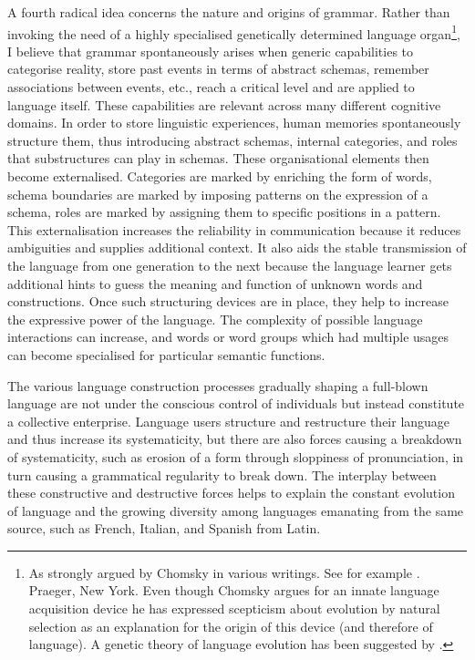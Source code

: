 A fourth radical idea concerns the nature and origins of 
grammar. Rather than invoking the need of a highly 
specialised genetically determined language 
organ\footnote{
As strongly argued by Chomsky in various writings. 
See for example \cite{Chomsky:1968}. 
Praeger, New York. Even though Chomsky argues for 
an innate language acquisition device he has expressed
scepticism about evolution by natural selection
as an explanation for the 
origin of this device (and therefore of language). 
A genetic theory of language evolution 
has been suggested by \cite{Pinker:1994}.}, 
I believe that grammar spontaneously arises when 
generic capabilities to categorise reality, store past
events in terms of abstract schemas, remember associations
between events, etc., reach a critical level and are
applied to language itself. These capabilities are 
relevant across many different cognitive domains. 
In order to store linguistic
experiences, human memories spontaneously structure them, thus 
introducing abstract schemas, internal categories, and 
roles that substructures can play in schemas.
These organisational elements then become externalised. 
Categories are marked by enriching
the form of words, schema boundaries are marked by 
imposing patterns on the expression of a schema, 
roles are marked by assigning
them to specific positions in a 
pattern. This externalisation 
increases the reliability in communication because
it reduces ambiguities and supplies additional context. It 
also aids the stable transmission of the language from one
generation to the next because the language learner
gets additional hints to guess the meaning and function of unknown
words and constructions. 
Once such structuring devices are in place, they help 
to increase the expressive power of the language. The 
complexity of possible language interactions can increase, 
and words or word groups which had multiple usages
can become specialised for particular semantic functions. 

The various language construction processes gradually 
shaping a full-blown language 
are not under the conscious control of individuals but
instead constitute a collective enterprise. Language users 
structure and restructure their language and thus increase its
systematicity, but there are also forces causing a breakdown 
of systematicity, such as erosion of a form 
through sloppiness of pronunciation, in turn causing a grammatical 
regularity to break down. The interplay between 
these constructive and destructive forces helps to explain
the constant evolution of language and the growing 
diversity among languages emanating from the same source, such as
French, Italian, and Spanish from Latin. 

